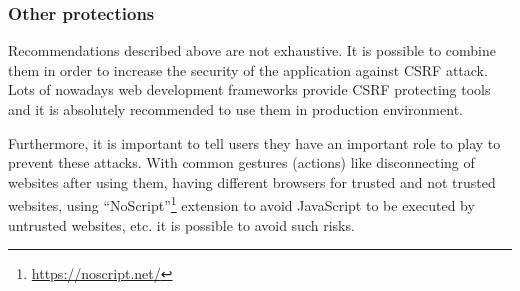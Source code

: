 \documentclass[a4paper,11pt,openany]{report}
\begin{document}
  
  \subsubsection{Other protections}
  
  Recommendations described above are not exhaustive. It is possible to combine them in order to increase 
  the security of the application against CSRF attack. Lots of nowadays web development frameworks provide 
  CSRF protecting tools and it is absolutely recommended to use them in production environment.
  
  Furthermore, it is important to tell users they have an important role to play to prevent these attacks. 
  With common gestures (actions) like disconnecting of websites after using them, having different browsers 
  for trusted and not trusted websites, using ``NoScript''\footnote{\url{https://noscript.net/}} extension to avoid JavaScript to be executed by 
  untrusted websites, etc. it is possible to avoid such risks.
  
\end{document}
